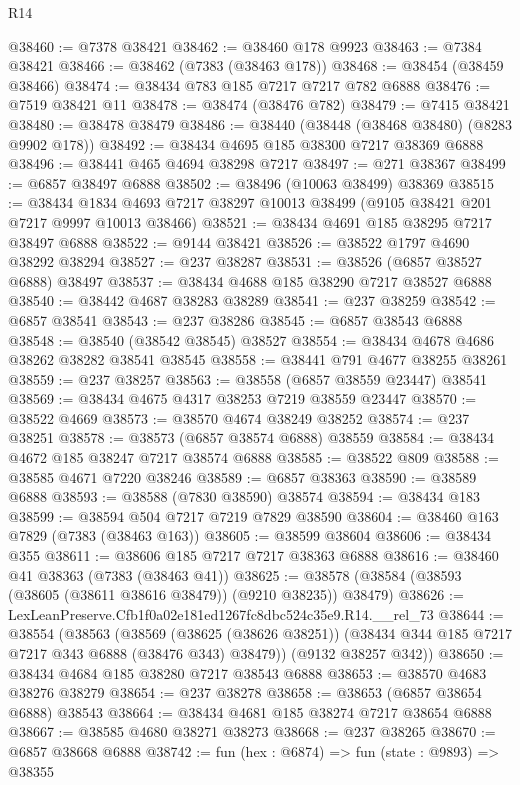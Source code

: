 \begin{lexlean}{R14}
\begin{coremodule}
@38460 := @7378 @38421
@38462 := @38460 @178 @9923
@38463 := @7384 @38421
@38466 := @38462 (@7383 (@38463 @178))
@38468 := @38454 (@38459 @38466)
@38474 := @38434 @783 @185 @7217 @7217 @782 @6888
@38476 := @7519 @38421 @11
@38478 := @38474 (@38476 @782)
@38479 := @7415 @38421
@38480 := @38478 @38479
@38486 := @38440 (@38448 (@38468 @38480) (@8283 @9902 @178))
@38492 := @38434 @4695 @185 @38300 @7217 @38369 @6888
@38496 := @38441 @465 @4694 @38298 @7217
@38497 := @271 @38367
@38499 := @6857 @38497 @6888
@38502 := @38496 (@10063 @38499) @38369
@38515 := @38434
    @1834
    @4693
    @7217
    @38297
    @10013
    @38499
    (@9105 @38421 @201 @7217 @9997 @10013 @38466)
@38521 := @38434 @4691 @185 @38295 @7217 @38497 @6888
@38522 := @9144 @38421
@38526 := @38522 @1797 @4690 @38292 @38294
@38527 := @237 @38287
@38531 := @38526 (@6857 @38527 @6888) @38497
@38537 := @38434 @4688 @185 @38290 @7217 @38527 @6888
@38540 := @38442 @4687 @38283 @38289
@38541 := @237 @38259
@38542 := @6857 @38541
@38543 := @237 @38286
@38545 := @6857 @38543 @6888
@38548 := @38540 (@38542 @38545) @38527
@38554 := @38434 @4678 @4686 @38262 @38282 @38541 @38545
@38558 := @38441 @791 @4677 @38255 @38261
@38559 := @237 @38257
@38563 := @38558 (@6857 @38559 @23447) @38541
@38569 := @38434 @4675 @4317 @38253 @7219 @38559 @23447
@38570 := @38522 @4669
@38573 := @38570 @4674 @38249 @38252
@38574 := @237 @38251
@38578 := @38573 (@6857 @38574 @6888) @38559
@38584 := @38434 @4672 @185 @38247 @7217 @38574 @6888
@38585 := @38522 @809
@38588 := @38585 @4671 @7220 @38246
@38589 := @6857 @38363
@38590 := @38589 @6888
@38593 := @38588 (@7830 @38590) @38574
@38594 := @38434 @183
@38599 := @38594 @504 @7217 @7219 @7829 @38590
@38604 := @38460 @163 @7829 (@7383 (@38463 @163))
@38605 := @38599 @38604
@38606 := @38434 @355
@38611 := @38606 @185 @7217 @7217 @38363 @6888
@38616 := @38460 @41 @38363 (@7383 (@38463 @41))
@38625 := @38578 (@38584 (@38593 (@38605 (@38611 @38616 @38479)) (@9210 @38235)) @38479)
@38626 := LexLeanPreserve.Cfb1f0a02e181ed1267fc8dbc524c35e9.R14.__rel_73
@38644 := @38554
    (@38563
      (@38569
        (@38625 (@38626 @38251))
        (@38434 @344 @185 @7217 @7217 @343 @6888 (@38476 @343) @38479))
      (@9132 @38257 @342))
@38650 := @38434 @4684 @185 @38280 @7217 @38543 @6888
@38653 := @38570 @4683 @38276 @38279
@38654 := @237 @38278
@38658 := @38653 (@6857 @38654 @6888) @38543
@38664 := @38434 @4681 @185 @38274 @7217 @38654 @6888
@38667 := @38585 @4680 @38271 @38273
@38668 := @237 @38265
@38670 := @6857 @38668 @6888
@38742 := fun (hex : @6874) =>
  fun (state : @9893) =>
  @38355

\end{coremodule}
\end{lexlean}
